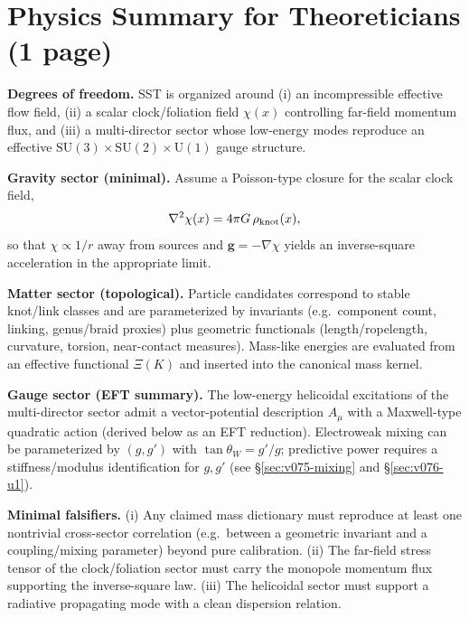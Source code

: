 \documentclass[10pt]{article}
\begin{document}

\section{Physics Summary for Theoreticians (1 page)}
\label{sec:v076-theory-summary}

\noindent\textbf{Degrees of freedom.}
SST is organized around (i) an incompressible effective flow field,
(ii) a scalar clock/foliation field $\chi(x)$ controlling far-field momentum flux,
and (iii) a multi-director sector whose low-energy modes reproduce an effective
$\mathrm{SU}(3)\times\mathrm{SU}(2)\times\mathrm{U}(1)$ gauge structure.

\medskip
\noindent\textbf{Gravity sector (minimal).}
Assume a Poisson-type closure for the scalar clock field,
\begin{equation}
\nabla^2 \chi(x) = 4\pi G\,\rho_{\rm knot}(x),
\end{equation}
so that $\chi \propto 1/r$ away from sources and $\mathbf{g}=-\nabla\chi$ yields an inverse-square
acceleration in the appropriate limit.

\medskip
\noindent\textbf{Matter sector (topological).}
Particle candidates correspond to stable knot/link classes and are parameterized by
invariants (e.g.\ component count, linking, genus/braid proxies) plus geometric
functionals (length/ropelength, curvature, torsion, near-contact measures).
Mass-like energies are evaluated from an effective functional $\Xi(K)$
and inserted into the canonical mass kernel.

\medskip
\noindent\textbf{Gauge sector (EFT summary).}
The low-energy helicoidal excitations of the multi-director sector admit a vector-potential
description $A_\mu$ with a Maxwell-type quadratic action (derived below as an EFT reduction).
Electroweak mixing can be parameterized by $(g,g')$ with $\tan\theta_W=g'/g$; predictive power
requires a stiffness/modulus identification for $g,g'$ (see \S\ref{sec:v075-mixing} and \S\ref{sec:v076-u1}).

\medskip
\noindent\textbf{Minimal falsifiers.}
(i) Any claimed mass dictionary must reproduce at least one nontrivial cross-sector correlation
(e.g.\ between a geometric invariant and a coupling/mixing parameter) beyond pure calibration.
(ii) The far-field stress tensor of the clock/foliation sector must carry the monopole momentum flux
supporting the inverse-square law.
(iii) The helicoidal sector must support a radiative propagating mode with a clean dispersion relation.
\end{document}
